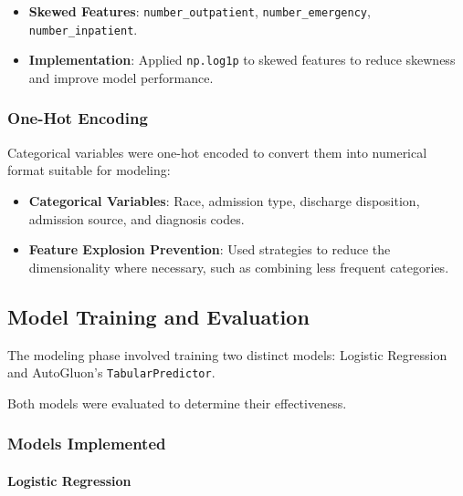 \documentclass{article}
\begin{document}
\begin{itemize}[leftmargin=*]
    \item \textbf{Skewed Features}: \texttt{number\_outpatient}, \texttt{number\_emergency}, \texttt{number\_inpatient}.
    \item \textbf{Implementation}: Applied \texttt{np.log1p} to skewed features to reduce skewness and improve model performance.
\end{itemize}

\subsubsection{One-Hot Encoding}

Categorical variables were one-hot encoded to convert them into numerical format suitable for modeling:

\begin{itemize}[leftmargin=*]
    \item \textbf{Categorical Variables}: Race, admission type, discharge disposition, admission source, and diagnosis codes.
    \item \textbf{Feature Explosion Prevention}: Used strategies to reduce the dimensionality where necessary, such as combining less frequent categories.
\end{itemize}

\subsection{Model Training and Evaluation}

The modeling phase involved training two distinct models: Logistic Regression and AutoGluon's \texttt{TabularPredictor}.

Both models were evaluated to determine their effectiveness.

\subsubsection{Models Implemented}

\paragraph{Logistic Regression}
\end{document}
